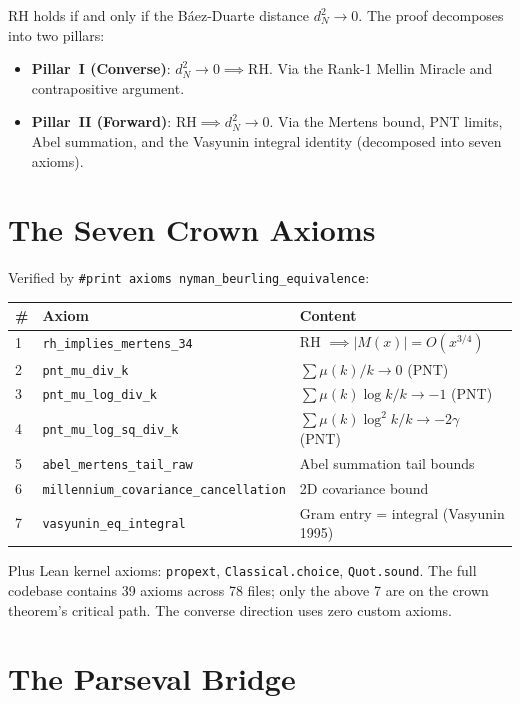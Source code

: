 \documentclass[12pt,a4paper]{article}
\begin{document}
\noindent RH holds if and only if the B\'aez-Duarte distance
$d_N^2 \to 0$. The proof decomposes into two pillars:

\begin{itemize}
\item \textbf{Pillar~I (Converse)}: $d_N^2 \to 0 \implies \mathrm{RH}$.
  Via the Rank-1 Mellin Miracle and contrapositive argument.
\item \textbf{Pillar~II (Forward)}: $\mathrm{RH} \implies d_N^2 \to 0$.
  Via the Mertens bound, PNT limits, Abel summation, and the
  Vasyunin integral identity (decomposed into seven axioms).
\end{itemize}

\section{The Seven Crown Axioms}

Verified by \texttt{\#print axioms nyman\_beurling\_equivalence}:

\begin{table}[h]
\centering
\begin{tabular}{@{}llp{5.5cm}@{}}
\toprule
\textbf{\#} & \textbf{Axiom} & \textbf{Content} \\
\midrule
1 & \texttt{rh\_implies\_mertens\_34} & RH $\implies |M(x)| = O(x^{3/4})$ \\
2 & \texttt{pnt\_mu\_div\_k} & $\sum \mu(k)/k \to 0$ (PNT) \\
3 & \texttt{pnt\_mu\_log\_div\_k} & $\sum \mu(k)\log k/k \to -1$ (PNT) \\
4 & \texttt{pnt\_mu\_log\_sq\_div\_k} & $\sum \mu(k)\log^2 k/k \to -2\gamma$ (PNT) \\
5 & \texttt{abel\_mertens\_tail\_raw} & Abel summation tail bounds \\
6 & \texttt{millennium\_covariance\_cancellation} & 2D covariance bound \\
7 & \texttt{vasyunin\_eq\_integral} & Gram entry = integral (Vasyunin 1995) \\
\bottomrule
\end{tabular}
\end{table}

\noindent Plus Lean kernel axioms: \texttt{propext}, \texttt{Classical.choice}, \texttt{Quot.sound}.
\noindent The full codebase contains 39 axioms across 78 files; only the above 7 are
on the crown theorem's critical path. The converse direction uses zero custom axioms.

\section{The Parseval Bridge}
\end{document}
